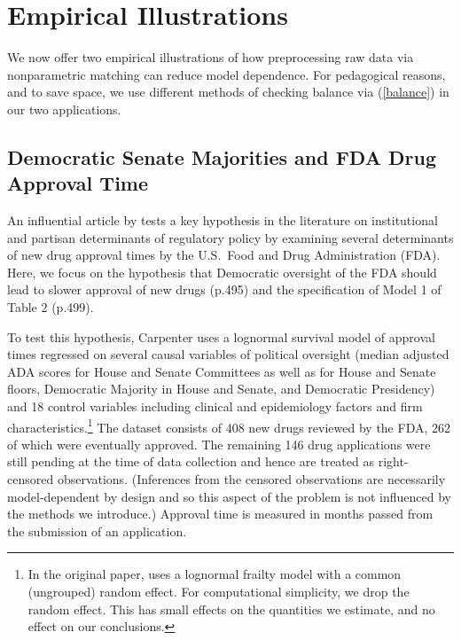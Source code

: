 \documentclass[11pt,titlepage]{article}
\begin{document}
\section{Empirical Illustrations}\label{s:emp}

We now offer two empirical illustrations of how preprocessing raw data
via nonparametric matching can reduce model dependence.  For
pedagogical reasons, and to save space, we use different methods of
checking balance via (\ref{balance}) in our two applications.

\subsection{Democratic Senate Majorities and FDA Drug Approval
  Time}\label{s:carp}

An influential article by \citet{Carpenter02} tests a key hypothesis
in the literature on institutional and partisan determinants of
regulatory policy by examining several determinants of new drug
approval times by the U.S.\ Food and Drug Administration (FDA).  Here,
we focus on the hypothesis that Democratic oversight of the FDA should
lead to slower approval of new drugs (p.495) and the specification of
Model 1 of Table 2 (p.499).

To test this hypothesis, Carpenter uses a lognormal survival model of
approval times regressed on several causal variables of political
oversight (median adjusted ADA scores for House and Senate Committees
as well as for House and Senate floors, Democratic Majority in House
and Senate, and Democratic Presidency) and 18 control variables
including clinical and epidemiology factors and firm
characteristics.\footnote{In the original paper, \citet{Carpenter02}
  uses a lognormal frailty model with a common (ungrouped) random
  effect.  For computational simplicity, we drop the random effect.
  This has small effects on the quantities we estimate, and no effect
  on our conclusions.}  The dataset consists of 408 new drugs reviewed
by the FDA, 262 of which were eventually approved.  The remaining 146
drug applications were still pending at the time of data collection
and hence are treated as right-censored observations.  (Inferences
from the censored observations are necessarily model-dependent by
design and so this aspect of the problem is not influenced by the
methods we introduce.)  Approval time is measured in months passed
from the submission of an application.
\end{document}

